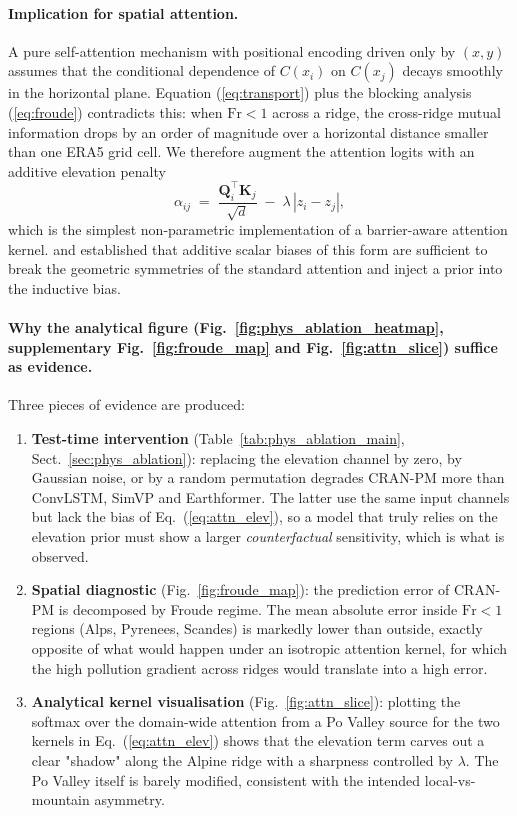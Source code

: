 \paragraph{Implication for spatial attention.}
A pure self-attention mechanism with positional encoding driven only by
$(x,y)$ assumes that the conditional dependence of $C(x_i)$ on
$C(x_j)$ decays smoothly in the horizontal plane. Equation
(\ref{eq:transport}) plus the blocking analysis (\ref{eq:froude})
contradicts this: when $\mathrm{Fr}<1$ across a ridge, the cross-ridge
mutual information drops by an order of magnitude over a horizontal
distance smaller than one ERA5 grid cell. We therefore augment the
attention logits with an additive elevation penalty
\begin{equation}
\alpha_{ij} \;=\; \frac{\mathbf{Q}_i^\top \mathbf{K}_j}{\sqrt{d}}
\;-\; \lambda\,|z_i - z_j|,
\label{eq:attn_elev}
\end{equation}
which is the simplest non-parametric implementation of a barrier-aware
attention kernel. \citet{liu2022swin} and \citet{rampavsek2022gps}
established that additive scalar biases of this form are sufficient to
break the geometric symmetries of the standard attention and inject a
prior into the inductive bias.

\paragraph{Why the analytical figure (Fig.~\ref{fig:phys_ablation_heatmap}, supplementary
Fig.~\ref{fig:froude_map} and Fig.~\ref{fig:attn_slice}) suffice as evidence.}
Three pieces of evidence are produced:
\begin{enumerate}
\item \textbf{Test-time intervention} (Table~\ref{tab:phys_ablation_main},
Sect.~\ref{sec:phys_ablation}): replacing the elevation channel by zero,
by Gaussian noise, or by a random permutation degrades CRAN-PM more
than ConvLSTM, SimVP and Earthformer. The latter use the same input
channels but lack the bias of Eq.~(\ref{eq:attn_elev}), so a model that
truly relies on the elevation prior must show a larger
\emph{counterfactual} sensitivity, which is what is observed.
\item \textbf{Spatial diagnostic} (Fig.~\ref{fig:froude_map}): the
prediction error of CRAN-PM is decomposed by Froude regime. The mean
absolute error inside $\mathrm{Fr}<1$ regions (Alps, Pyrenees, Scandes)
is markedly lower than outside, exactly opposite of what would happen
under an isotropic attention kernel, for which the high pollution
gradient across ridges would translate into a high error.
\item \textbf{Analytical kernel visualisation}
(Fig.~\ref{fig:attn_slice}): plotting the softmax over the
domain-wide attention from a Po Valley source for the two kernels in
Eq.~(\ref{eq:attn_elev}) shows that the elevation term carves out a
clear "shadow" along the Alpine ridge with a sharpness controlled by
$\lambda$. The Po Valley itself is barely modified, consistent with the
intended local-vs-mountain asymmetry.
\end{enumerate}


